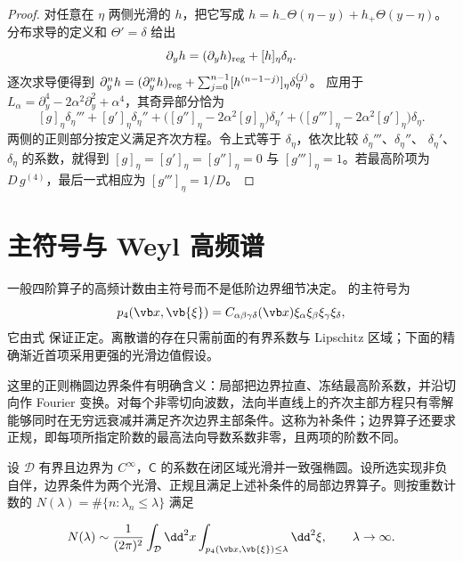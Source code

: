 \begin{proof}
对任意在 \(\eta\) 两侧光滑的 \(h\)，把它写成
\(h=h_-\Theta(\eta-y)+h_+\Theta(y-\eta)\)。分布求导的定义和
\(\Theta'=\delta\) 给出
\[
 \partial_y h=(\partial_yh)_{\rm reg}+[h]_\eta\delta_\eta.
\]
逐次求导便得到
\(\partial_y^n h=(\partial_y^n h)_{\rm reg}
+\sum_{j=0}^{n-1}[h^{(n-1-j)}]_\eta\delta_\eta^{(j)}\)。
应用于 \(L_\alpha=\partial_y^4-2\alpha^2\partial_y^2+\alpha^4\)，其奇异部分恰为
\[
 [g]_\eta\delta_\eta'''
 +[g']_\eta\delta_\eta''
 +\bigl([g'']_\eta-2\alpha^2[g]_\eta\bigr)\delta_\eta'
 +\bigl([g''']_\eta-2\alpha^2[g']_\eta\bigr)\delta_\eta.
\]
两侧的正则部分按定义满足齐次方程。令上式等于
\(\delta_\eta\)，依次比较 \(\delta_\eta'''\)、\(\delta_\eta''\)、
\(\delta_\eta'\)、\(\delta_\eta\) 的系数，就得到
\([g]_\eta=[g']_\eta=[g'']_\eta=0\) 与
\([g''']_\eta=1\)。若最高阶项为 \(D\,g^{(4)}\)，最后一式相应为
\([g''']_\eta=1/D\)。
\end{proof}

\section{主符号与 Weyl 高频谱}

一般四阶算子的高频计数由主符号而不是低阶边界细节决定。 的主符号为
\begin{equation}
 p_4(\vb x,\vb{\xi})
 =C_{\alpha\beta\gamma\delta}(\vb x)
 \xi_\alpha\xi_\beta\xi_\gamma\xi_\delta,
 \label{eq:phys-cont-general-principal-symbol}
\end{equation}
它由式 保证正定。离散谱的存在只需前面的有界系数与 Lipschitz 区域；下面的精确渐近首项采用更强的光滑边值假设。

这里的正则椭圆边界条件有明确含义：局部把边界拉直、冻结最高阶系数，并沿切向作 Fourier 变换。对每个非零切向波数，法向半直线上的齐次主部方程只有零解能够同时在无穷远衰减并满足齐次边界主部条件。这称为补条件；边界算子还要求正规，即每项所指定阶数的最高法向导数系数非零，且两项的阶数不同。

\begin{theorem}
设 $\mathcal D$ 有界且边界为 $C^\infty$，$\mathsf C$ 的系数在闭区域光滑并一致强椭圆。设所选实现非负自伴，边界条件为两个光滑、正规且满足上述补条件的局部边界算子。则按重数计数的 $N(\lambda)=\#\{n:\lambda_n\le\lambda\}$ 满足

\begin{equation}
 N(\lambda)
 \sim\frac{1}{(2\pi)^2}
 \int_\mathcal D\dd^2x
 \int_{p_4(\vb x,\vb{\xi})\le\lambda}\dd^2\xi,
 \qquad \lambda\to\infty.
 \label{eq:phys-cont-general-weyl}
\end{equation}
\end{theorem}

